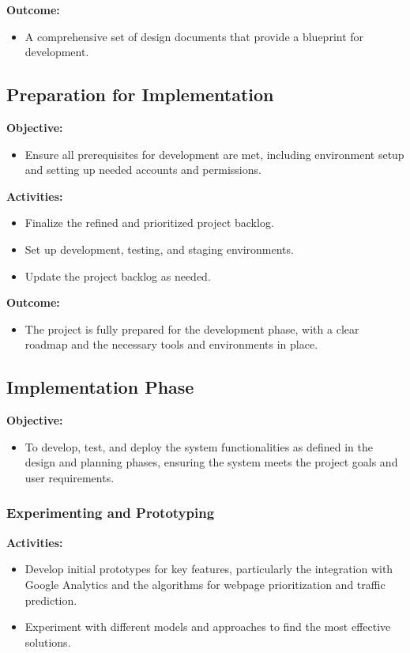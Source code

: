 \documentclass[12pt,a4paper]{article}
\begin{document}
\noindent \textbf{Outcome:}
\begin{itemize}
    \item A comprehensive set of design documents that provide a blueprint for development.
\end{itemize}

\subsection{Preparation for Implementation}

\noindent \textbf{Objective:}
\begin{itemize}
    \item Ensure all prerequisites for development are met, including environment setup and setting up needed accounts and permissions.
\end{itemize}

\noindent \textbf{Activities:}
\begin{itemize}
    \item Finalize the refined and prioritized project backlog.
    \item Set up development, testing, and staging environments.
    \item Update the project backlog as needed.
\end{itemize}

\noindent \textbf{Outcome:}
\begin{itemize}
    \item The project is fully prepared for the development phase, with a clear roadmap and the necessary tools and environments in place.
\end{itemize}

\subsection{Implementation Phase}

\noindent \textbf{Objective:}
\begin{itemize}
    \item To develop, test, and deploy the system functionalities as defined in the design and planning phases, ensuring the system meets the project goals and user requirements.
\end{itemize}
\subsubsection{Experimenting and Prototyping}

\noindent \textbf{Activities:}
\begin{itemize}
    \item Develop initial prototypes for key features, particularly the integration with Google Analytics and the algorithms for webpage prioritization and traffic prediction.
    \item Experiment with different models and approaches to find the most effective solutions.
\end{itemize}
\end{document}
